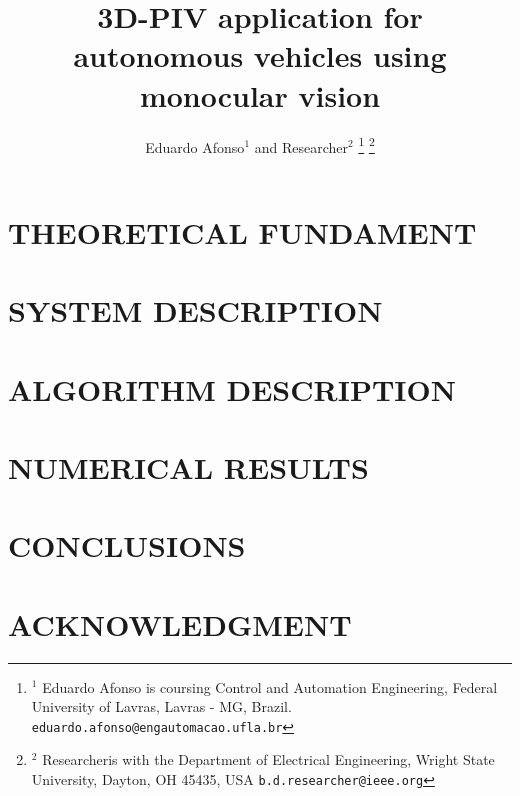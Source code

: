 \documentclass[letterpaper, 10 pt, conference]{ieeeconf}  %
\title{\LARGE \bf
3D-PIV application for autonomous vehicles using monocular vision
}
\author{Eduardo Afonso$^{1}$ and Researcher$^{2}$%
\thanks{$^{1}$ Eduardo Afonso is coursing Control and Automation Engineering,
        Federal University of Lavras, Lavras - MG, Brazil.
        {\tt\small eduardo.afonso@engautomacao.ufla.br}}%
\thanks{$^{2}$ Researcheris with the Department of Electrical Engineering, Wright State University,
        Dayton, OH 45435, USA
        {\tt\small b.d.researcher@ieee.org}}%
}
\begin{document}
\maketitle
\thispagestyle{empty}
\pagestyle{empty}

\begin{abstract}


\end{abstract}



\section{THEORETICAL FUNDAMENT}




\section{SYSTEM DESCRIPTION}


\section{ALGORITHM DESCRIPTION}
 




\section{NUMERICAL RESULTS}

\section{CONCLUSIONS}

\addtolength{\textheight}{-12cm}

\section*{ACKNOWLEDGMENT}

\end{document}
